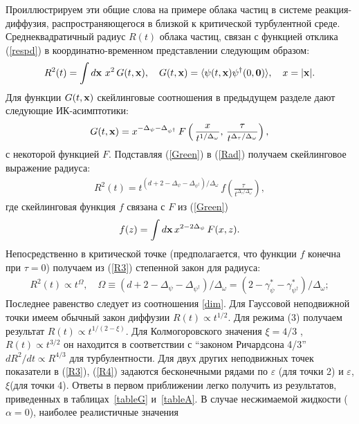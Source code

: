\documentclass[a4paper,10pt]{article}
\begin{document}
Проиллюстрируем эти общие слова на примере облака частиц в системе реакция-диффузия, распространяющегося в близкой к критической турбулентной среде.
Среднеквадратичный радиус $R(t)$ облака частиц, связан с  функцией отклика (\ref{respd}) в координатно-временном представлении следующим образом:
\begin{eqnarray}
R^{2}(t) = \int d{\bf x}\ x^{2}\, G(t,{\bf x}), \quad
G(t,{\bf x}) = \langle \psi (t,{\bf x}) \psi^{\dag} (0,{\bf 0}) \rangle,
\quad x=|{\bf x}|.
\label{Rad}
\end{eqnarray}
Для  функции $G(t,{\bf x})$ скейлинговые соотношения в предыдущем разделе дают следующие ИК-асимптотики:
\begin{eqnarray}
G(t,{\bf x}) = x^{-\Delta_{\psi}-\Delta_{\psi^{\dag}}} \, F
\left(\, \frac{x} { t^ {1/\Delta_{\omega}} }, \,
\frac{\tau}{t^{\Delta_{\tau}/\Delta_{\omega}}}  \right),
\label{Green}
\end{eqnarray}
с некоторой функцией $F$.
Подставляя (\ref{Green}) в (\ref{Rad}) получаем скейлинговое выражение радиуса:
\begin{eqnarray}
R^2(t) = t^{ (d+2 -\Delta_{\psi}-\Delta_{\psi^{\dag}})/\Delta_{\omega} }
\, f \left( \frac{\tau}{t^{\Delta_{\tau}/\Delta_{\omega}}}  \right),
\label{R3}
\end{eqnarray}
где скейлинговая функция $f$  связана с $ F $ из (\ref{Green})
\[ f (z) = \int d{\bf x}\, x^{2-2\Delta_{\psi}} \, F(x,z). \]
Непосредственно в критической точке (предполагается, что функции  $f$  конечна при $\tau=0$) получаем из 
(\ref{R3}) степенной закон для радиуса: 
\begin{eqnarray}
R^2(t) \propto t^\Omega, \quad \Omega \equiv { (d+2
-\Delta_{\psi}-\Delta_{\psi^{\dag}})/ \Delta_{\omega} } =
{(2-\gamma_{\psi}^{*}-\gamma_{\psi^{\dag}}^{*})/\Delta_{\omega} };
\label{R4}
\end{eqnarray}
Последнее равенство следует из соотношения  \ref{dim}.
Для Гауссовой неподвижной точки имеем обычный закон диффузии  $R(t)\propto t^{1/2}$.
Для режима (3) получаем результат $R(t)\propto t^{1/(2-\xi)}$. Для Колмогоровского
значения $\xi=4/3$ , $R(t)\propto t^{3/2}$ он находится в соответствии с ``законом Ричардсона 4/3''
 $dR^{2}/dt \propto R^{4/3}$ для турбулентности. 
Для двух других неподвижных точек показатели в (\ref{R3}), (\ref{R4}) задаются бесконечными рядами 
по $\varepsilon$  (для точки 2) и  $\varepsilon$, $\xi$(для точки 4). Ответы в первом приближении легко получить из результатов, приведенных в таблицах~\ref{tableG} и~\ref{tableA}.
В случае несжимаемой жидкости  ($\alpha=0$), наиболее реалистичные значения
\end{document}

